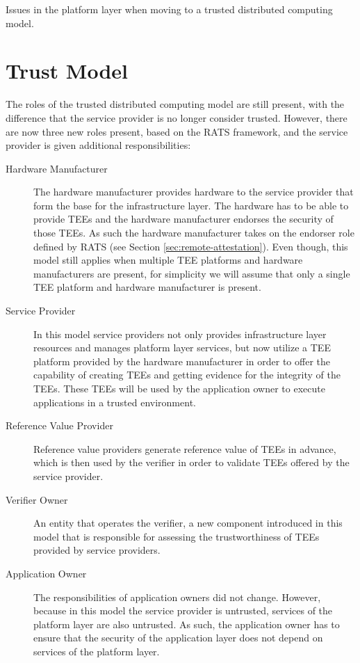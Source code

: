\begin{table}[H]
  \centering
  \scriptsize
  
  \caption{Issues in the platform layer when moving to a trusted distributed computing model.}
\end{table}

\section{Trust Model}
\label{sec:trusted-trust-model}

The roles of the trusted distributed computing model are still present, with the
difference that the service provider is no longer consider trusted. However,
there are now three new roles present, based on the RATS framework, and the
service provider is given additional responsibilities:

\begin{description}
  \item[Hardware Manufacturer]
    The hardware manufacturer provides hardware to the service provider that
    form the base for the infrastructure layer. The hardware has to be able to
    provide TEEs and the hardware manufacturer endorses the security of those
    TEEs. As such the hardware manufacturer takes on the endorser role defined
    by RATS (see Section \ref{sec:remote-attestation}). Even though, this model
    still applies when multiple TEE platforms and hardware manufacturers are
    present, for simplicity we will assume that only a single TEE platform and
    hardware manufacturer is present.

  \item[Service Provider]
    In this model service providers not only provides infrastructure layer
    resources and manages platform layer services, but now utilize a TEE
    platform provided by the hardware manufacturer in order to offer the
    capability of creating TEEs and getting evidence for the integrity of the
    TEEs. These TEEs will be used by the application owner to execute
    applications in a trusted environment.

  \item[Reference Value Provider]
    Reference value providers generate reference value of TEEs in advance,
    which is then used by the verifier in order to validate TEEs offered by the
    service provider.

  \item[Verifier Owner]
    An entity that operates the verifier, a new component introduced in this
    model that is responsible for assessing the trustworthiness of TEEs provided
    by service providers.

  \item[Application Owner]
    The responsibilities of application owners did not change. However, because
    in this model the service provider is untrusted, services of the platform
    layer are also untrusted. As such, the application owner has to ensure that
    the security of the application layer does not depend on services of the
    platform layer.
\end{description}

